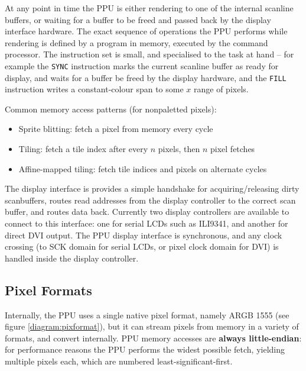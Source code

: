 At any point in time the PPU is either rendering to one of the internal scanline buffers, or waiting for a buffer to be freed and passed back by the display interface hardware. The exact sequence of operations the PPU performs while rendering is defined by a program in memory, executed by the command processor. The instruction set is small, and specialised to the task at hand -- for example the {\tt SYNC} instruction marks the current scanline buffer as ready for display, and waits for a buffer be freed by the display hardware, and the {\tt FILL} instruction writes a constant-colour span to some $x$ range of pixels.

Common memory access patterns (for nonpaletted pixels):

\begin{itemize}
	\item Sprite blitting: fetch a pixel from memory every cycle
	\item Tiling: fetch a tile index after every $n$ pixels, then $n$ pixel fetches
	\item Affine-mapped tiling: fetch tile indices and pixels on alternate cycles
\end{itemize}

The display interface is provides a simple handshake for acquiring/releasing dirty scanbuffers, routes read addresses from the display controller to the correct scan buffer, and routes data back. Currently two display controllers are available to connect to this interface: one for serial LCDs such as ILI9341, and another for direct DVI output. The PPU display interface is synchronous, and any clock crossing (to SCK domain for serial LCDs, or pixel clock domain for DVI) is handled inside the display controller.

\subsection{Pixel Formats}

Internally, the PPU uses a single native pixel format, namely ARGB 1555 (see figure \ref{diagram:pixformat}), but it can stream pixels from memory in a variety of formats, and convert internally. PPU memory accesses are \textbf{always little-endian}: for performance reasons the PPU performs the widest possible fetch, yielding multiple pixels each, which are numbered least-significant-first.

